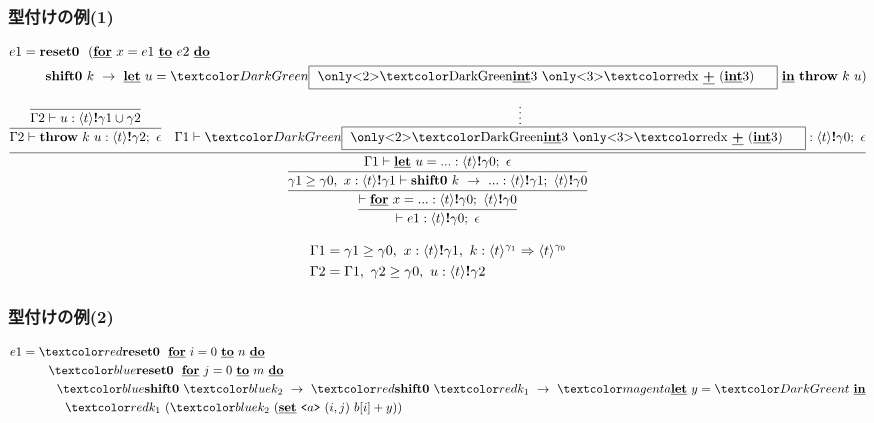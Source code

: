 \newcommand\boxterm{\framebox{
\only<2>{\green{\cint{3}}}
\only<3>{\red{x~\cPlus~(\cint{3})}}
\phantom{A}
}}

\begin{frame}
  \frametitle{型付けの例(1)}
  \begin{align*}
    e1 & = \Resetz ~~(\cfordo{x = e1}{e2} \\
      & \phantom{=}~~~ \Shiftz~k~\to~
    {\cLet~u=\green{\boxterm}~\cIn}~\Throw~k~u)
  \end{align*}

\[
\infer{\vdash e1 : \codeTs{t}{\gamma0};~\epsilon}
      {\infer{\vdash \cfor{x=...} :
                \codeTs{t}{\gamma0};~\codeTs{t}{\gamma0}}
             {\infer{\gamma1 \ord \gamma0,~x:\codeTs{t}{\gamma1} 
                     \vdash \Shiftz~k~\to~... :
                     \codeTs{t}{\gamma1};~\codeTs{t}{\gamma0}}
                    {\infer{\Gamma1 \vdash \cLet~u=...:\codeTs{t}{\gamma0};~\epsilon}
                           {\infer{\Gamma2 \vdash
                                    \Throw~k~u:\codeTs{t}{\gamma2};~\epsilon }
                                  {\infer{\Gamma2 \vdash
                                      u:\codeTs{t}{\gamma1 \cup \gamma2}}
                                         {}
                                  }
                           &\infer*{\Gamma1 \vdash
                                     \green{\boxterm}:\codeTs{t}{\gamma0};~\epsilon}
                                   {}
                           }
                    }
             }
      }
\]

{\footnotesize
\begin{align*}
\Gamma1 &= \gamma1 \ge \gamma0,~x:\langle{t}\rangle{\textbf{!}{\gamma1}},
~k: {\langle{t}\rangle^{\gamma_1}} \Rightarrow {\langle{t}\rangle^{\gamma_0}} \\
\Gamma2 &= \Gamma1,~\gamma2 \ge \gamma0,~u:\langle{t}\rangle{\textbf{!}{\gamma2}}  
\end{align*}
}


\end{frame}

\begin{frame}
  \frametitle{型付けの例(2)}
  \begin{align*}
    e1 & = \red{\Resetz} ~~\cfordo{i = 0}{n} \\
      & \phantom{=}~~~~\blue{\Resetz} ~~\cfordo{j = 0}{m} \\
      & \phantom{=}~~~~~~ \blue{\Shiftz}~\blue{k_2}~\to~ \red{\Shiftz}~\red{k_1}~\to~ \magenta{\cLet~y=\green{t}~\cIn} \\
      & \phantom{=}~~~~~~~~ \red{k_1}~(\blue{k_2}~(\caryset{\code{a}}{(i,j)}{b[i] + y}))
  \end{align*}


\end{frame}

